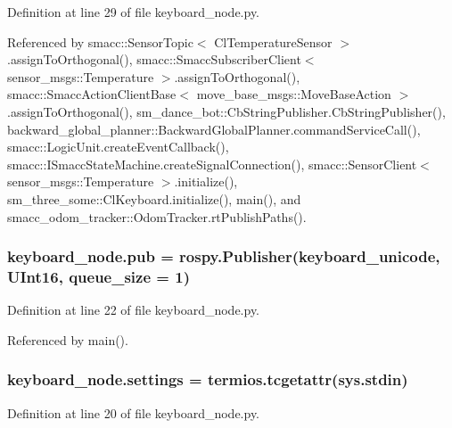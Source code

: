 Definition at line 29 of file keyboard\+\_\+node.\+py.



Referenced by smacc\+::\+Sensor\+Topic$<$ Cl\+Temperature\+Sensor $>$.\+assign\+To\+Orthogonal(), smacc\+::\+Smacc\+Subscriber\+Client$<$ sensor\+\_\+msgs\+::\+Temperature $>$.\+assign\+To\+Orthogonal(), smacc\+::\+Smacc\+Action\+Client\+Base$<$ move\+\_\+base\+\_\+msgs\+::\+Move\+Base\+Action $>$.\+assign\+To\+Orthogonal(), sm\+\_\+dance\+\_\+bot\+::\+Cb\+String\+Publisher.\+Cb\+String\+Publisher(), backward\+\_\+global\+\_\+planner\+::\+Backward\+Global\+Planner.\+command\+Service\+Call(), smacc\+::\+Logic\+Unit.\+create\+Event\+Callback(), smacc\+::\+I\+Smacc\+State\+Machine.\+create\+Signal\+Connection(), smacc\+::\+Sensor\+Client$<$ sensor\+\_\+msgs\+::\+Temperature $>$.\+initialize(), sm\+\_\+three\+\_\+some\+::\+Cl\+Keyboard.\+initialize(), main(), and smacc\+\_\+odom\+\_\+tracker\+::\+Odom\+Tracker.\+rt\+Publish\+Paths().

\subsubsection[{\texorpdfstring{pub}{pub}}]{\setlength{\rightskip}{0pt plus 5cm}keyboard\+\_\+node.\+pub = rospy.\+Publisher(\textquotesingle{}keyboard\+\_\+unicode\textquotesingle{}, U\+Int16, queue\+\_\+size = 1)}\hypertarget{namespacekeyboard__node_af6db75302d320b64f2d03f7b84404a9f}{}\label{namespacekeyboard__node_af6db75302d320b64f2d03f7b84404a9f}


Definition at line 22 of file keyboard\+\_\+node.\+py.



Referenced by main().

\subsubsection[{\texorpdfstring{settings}{settings}}]{\setlength{\rightskip}{0pt plus 5cm}keyboard\+\_\+node.\+settings = termios.\+tcgetattr(sys.\+stdin)}\hypertarget{namespacekeyboard__node_aaf29d185963f7dbed690d072de1a0b17}{}\label{namespacekeyboard__node_aaf29d185963f7dbed690d072de1a0b17}


Definition at line 20 of file keyboard\+\_\+node.\+py.

